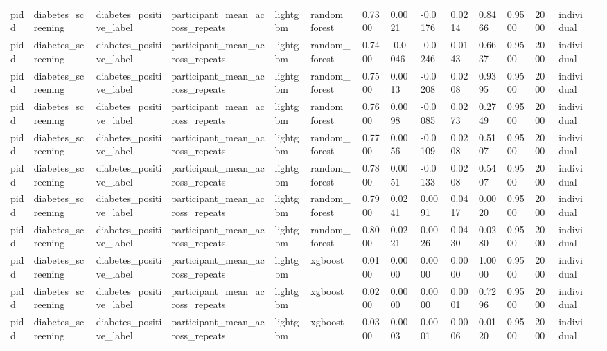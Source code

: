 \begin{tabular}{lllllllllllllll}
pidd & diabetes\_screening & diabetes\_positive\_label & participant\_mean\_across\_repeats & lightgbm & random\_forest & 0.7300 & 0.0021 & -0.0176 & 0.0214 & 0.8466 & 0.9500 & 2000 & individual &  \\
pidd & diabetes\_screening & diabetes\_positive\_label & participant\_mean\_across\_repeats & lightgbm & random\_forest & 0.7400 & -0.0046 & -0.0246 & 0.0143 & 0.6637 & 0.9500 & 2000 & individual &  \\
pidd & diabetes\_screening & diabetes\_positive\_label & participant\_mean\_across\_repeats & lightgbm & random\_forest & 0.7500 & 0.0013 & -0.0208 & 0.0208 & 0.9395 & 0.9500 & 2000 & individual &  \\
pidd & diabetes\_screening & diabetes\_positive\_label & participant\_mean\_across\_repeats & lightgbm & random\_forest & 0.7600 & 0.0098 & -0.0085 & 0.0273 & 0.2749 & 0.9500 & 2000 & individual &  \\
pidd & diabetes\_screening & diabetes\_positive\_label & participant\_mean\_across\_repeats & lightgbm & random\_forest & 0.7700 & 0.0056 & -0.0109 & 0.0208 & 0.5107 & 0.9500 & 2000 & individual &  \\
pidd & diabetes\_screening & diabetes\_positive\_label & participant\_mean\_across\_repeats & lightgbm & random\_forest & 0.7800 & 0.0051 & -0.0133 & 0.0208 & 0.5407 & 0.9500 & 2000 & individual &  \\
pidd & diabetes\_screening & diabetes\_positive\_label & participant\_mean\_across\_repeats & lightgbm & random\_forest & 0.7900 & 0.0241 & 0.0091 & 0.0417 & 0.0020 & 0.9500 & 2000 & individual &  \\
pidd & diabetes\_screening & diabetes\_positive\_label & participant\_mean\_across\_repeats & lightgbm & random\_forest & 0.8000 & 0.0221 & 0.0026 & 0.0430 & 0.0280 & 0.9500 & 2000 & individual &  \\
pidd & diabetes\_screening & diabetes\_positive\_label & participant\_mean\_across\_repeats & lightgbm & xgboost & 0.0100 & 0.0000 & 0.0000 & 0.0000 & 1.0000 & 0.9500 & 2000 & individual &  \\
pidd & diabetes\_screening & diabetes\_positive\_label & participant\_mean\_across\_repeats & lightgbm & xgboost & 0.0200 & 0.0000 & 0.0000 & 0.0001 & 0.7296 & 0.9500 & 2000 & individual &  \\
pidd & diabetes\_screening & diabetes\_positive\_label & participant\_mean\_across\_repeats & lightgbm & xgboost & 0.0300 & 0.0003 & 0.0001 & 0.0006 & 0.0120 & 0.9500 & 2000 & individual &  \\

\end{tabular}
